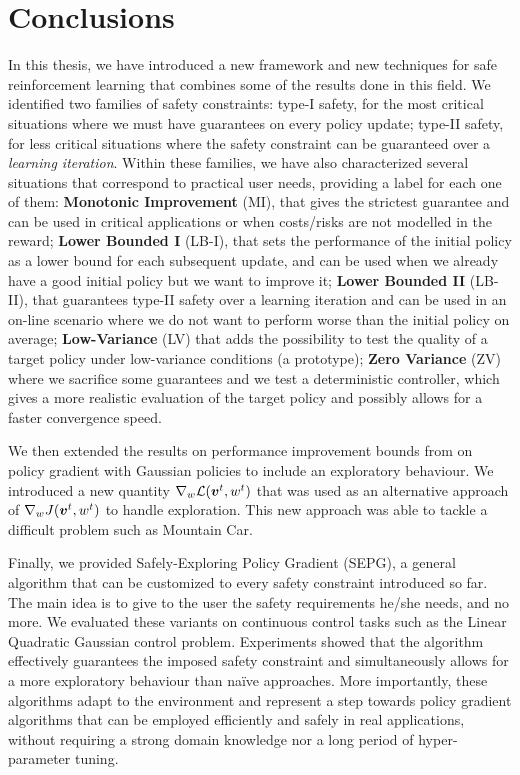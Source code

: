 \chapter{Conclusions}
\label{ch:conclusion}

In this thesis, we have introduced a new framework and new techniques for safe reinforcement learning that combines some of the results done in this field. We identified two families of safety constraints: type-I safety, for the most critical situations where we must have guarantees on every policy update; type-II safety, for less critical situations where the safety constraint can be guaranteed over a \textit{learning iteration}. Within these families, we have also characterized several situations that correspond to practical user needs, providing a label for each one of them:
\textbf{Monotonic Improvement} (MI), that gives the strictest guarantee and can be used in critical applications or when costs/risks are not modelled in the reward; \textbf{Lower Bounded I} (LB-I), that sets the performance of the initial policy as a lower bound for each subsequent update, and can be used when we already have a good initial policy but we want to improve it; \textbf{Lower Bounded II} (LB-II), that guarantees type-II safety over a learning iteration and can be used in an on-line scenario where we do not want to perform worse than the initial policy on average; \textbf{Low-Variance} (LV) that adds the possibility to test the quality of a target policy under low-variance conditions (\eg a prototype); \textbf{Zero Variance} (ZV) where we sacrifice some guarantees and we test a deterministic controller, which gives a more realistic evaluation of the target policy and possibly allows for a faster convergence speed.



We then extended the results on performance improvement bounds from \cite{adaptive_batch,adaptive_step} on policy gradient with Gaussian policies to include an exploratory behaviour. We introduced a new quantity $\nabla_{w}\mathcal{L}(\boldsymbol{v}^t, w^t)$ that was used as an alternative approach of $\nabla_w J(\boldsymbol{v}^t, w^t)$ to handle exploration. This new approach was able to tackle a difficult problem such as Mountain Car.

Finally, we provided Safely-Exploring Policy Gradient (SEPG), a general algorithm that can be customized to every safety constraint introduced so far. The main idea is to give to the user the safety requirements he/she needs, and no more. We evaluated these variants on continuous control tasks such as the Linear Quadratic Gaussian control problem. Experiments showed that the algorithm effectively guarantees the imposed safety constraint and simultaneously allows for a more exploratory behaviour than na\"ive approaches. More importantly, these algorithms adapt to the environment and represent a step towards policy gradient algorithms that can be employed efficiently and safely in real applications, without requiring a strong domain knowledge nor a long period of hyper-parameter tuning. 

